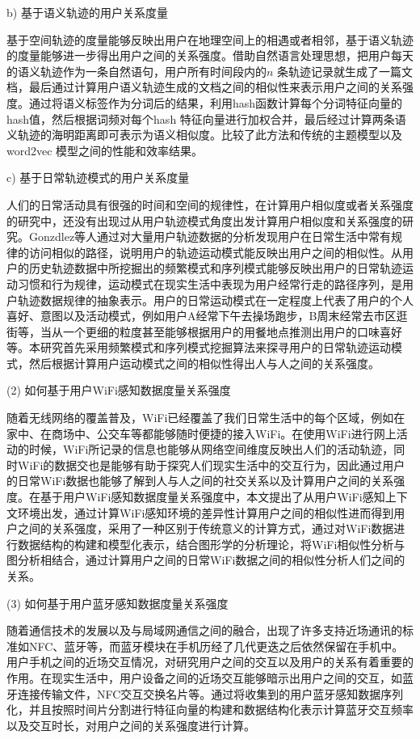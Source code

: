 \par b) 基于语义轨迹的用户关系度量
\par 基于空间轨迹的度量能够反映出用户在地理空间上的相遇或者相邻，基于语义轨迹的度量能够进一步得出用户之间的关系强度。借助自然语言处理思想，把用户每天的语义轨迹作为一条自然语句，用户所有时间段内的$n$ 条轨迹记录就生成了一篇文档，最后通过计算用户语义轨迹生成的文档之间的相似性来表示用户之间的关系强度。通过将语义标签作为分词后的结果，利用hash函数计算每个分词特征向量的hash值，然后根据词频对每个hash 特征向量进行加权合并，最后经过计算两条语义轨迹的海明距离即可表示为语义相似度。比较了此方法和传统的主题模型以及word2vec 模型之间的性能和效率结果。
\par c) 基于日常轨迹模式的用户关系度量
\par 人们的日常活动具有很强的时间和空间的规律性，在计算用户相似度或者关系强度的研究中，还没有出现过从用户轨迹模式角度出发计算用户相似度和关系强度的研究。Gonzdlez等人通过对大量用户轨迹数据的分析发现用户在日常生活中常有规律的访问相似的路径，说明用户的轨迹运动模式能反映出用户之间的相似性。从用户的历史轨迹数据中所挖掘出的频繁模式和序列模式能够反映出用户的日常轨迹运动习惯和行为规律，运动模式在现实生活中表现为用户经常行走的路径序列，是用户轨迹数据规律的抽象表示。用户的日常运动模式在一定程度上代表了用户的个人喜好、意图以及活动模式，例如用户A经常下午去操场跑步，B周末经常去市区逛街等，当从一个更细的粒度甚至能够根据用户的用餐地点推测出用户的口味喜好等。本研究首先采用频繁模式和序列模式挖掘算法来探寻用户的日常轨迹运动模式，然后根据计算用户运动模式之间的相似性得出人与人之间的关系强度。
\par (2) 如何基于用户WiFi感知数据度量关系强度
\par 随着无线网络的覆盖普及，WiFi已经覆盖了我们日常生活中的每个区域，例如在家中、在商场中、公交车等都能够随时便捷的接入WiFi。在使用WiFi进行网上活动的时候，WiFi所记录的信息也能够从网络空间维度反映出人们的活动轨迹，同时WiFi的数据交也是能够有助于探究人们现实生活中的交互行为，因此通过用户的日常WiFi数据也能够了解到人与人之间的社交关系以及计算用户之间的关系强度。在基于用户WiFi感知数据度量关系强度中，本文提出了从用户WiFi感知上下文环境出发，通过计算WiFi感知环境的差异性计算用户之间的相似性进而得到用户之间的关系强度，采用了一种区别于传统意义的计算方式，通过对WiFi数据进行数据结构的构建和模型化表示，结合图形学的分析理论，将WiFi相似性分析与图分析相结合，通过计算用户之间的日常WiFi数据之间的相似性分析人们之间的关系。
\par (3) 如何基于用户蓝牙感知数据度量关系强度
\par 随着通信技术的发展以及与局域网通信之间的融合，出现了许多支持近场通讯的标准如NFC、蓝牙等，而蓝牙模块在手机历经了几代更迭之后依然保留在手机中。用户手机之间的近场交互情况，对研究用户之间的交互以及用户的关系有着重要的作用。在现实生活中，用户设备之间的近场交互能够暗示出用户之间的交互，如蓝牙连接传输文件，NFC交互交换名片等。通过将收集到的用户蓝牙感知数据序列化，并且按照时间片分割进行特征向量的构建和数据结构化表示计算蓝牙交互频率以及交互时长，对用户之间的关系强度进行计算。
